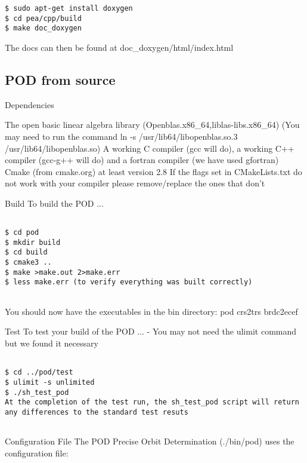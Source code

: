 \begin{verbatim}
$ sudo apt-get install doxygen
$ cd pea/cpp/build
$ make doc_doxygen
\end{verbatim}
The docs can then be found at doc\_doxygen/html/index.html

\subsection{POD from source}



Dependencies

The open basic linear algebra library (Openblas.x86\_64,liblas-libs.x86\_64) (You may need to run the command ln -s /usr/lib64/libopenblas.so.3 /usr/lib64/libopenblas.so)
A working C compiler (gcc will do), a working C++ compiler (gcc-g++ will do) and a fortran compiler (we have used gfortran)
Cmake (from cmake.org) at least version 2.8
If the flags set in CMakeLists.txt do not work with your compiler please remove/replace the ones that don't

Build
To build the POD ...
\begin{verbatim}

$ cd pod
$ mkdir build
$ cd build
$ cmake3 .. 
$ make >make.out 2>make.err
$ less make.err (to verify everything was built correctly)
    
\end{verbatim}
You should now have the executables in the bin directory: pod crs2trs brdc2ecef

Test
To test your build of the POD ... - You may not need the ulimit command but we found it necessary

\begin{verbatim}

$ cd ../pod/test
$ ulimit -s unlimited
$ ./sh_test_pod
At the completion of the test run, the sh_test_pod script will return any differences to the standard test resuts
    
\end{verbatim}

Configuration File
The POD Precise Orbit Determination (./bin/pod) uses the configuration file: 


%
